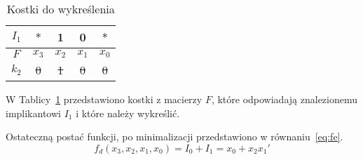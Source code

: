 \begin{table}[H]
    \centering
    \begin{tabular}[t]{ |c|c c c c| }
        \hline
        $I_1$ & $*$ & 1 & 0 & $*$ \\
        \hline\hline
        $F$ & $x_3$ & $x_2$ & $x_1$ & $x_0$ \\
        \hline
        \sout{$k_2$} & \sout{0} & \sout{1} & \sout{0} & \sout{0} \\
        \hline
    \end{tabular}
    \caption{Kostki do wykreślenia}\label{tab:die-1e}
\end{table}
W Tablicy~\ref{tab:die-1e} przedstawiono kostki z macierzy $F$, które odpowiadają znalezionemu implikantowi $I_1$
i które należy wykreślić.

Ostateczną postać funkcji, po minimalizacji przedstawiono w równaniu~\ref{eq:fe}.
\begin{equation}
    \label{eq:fe}
    f_d(x_3, x_2, x_1, x_0) = I_0 + I_1 = x_0 + x_{2}x_1'
\end{equation}